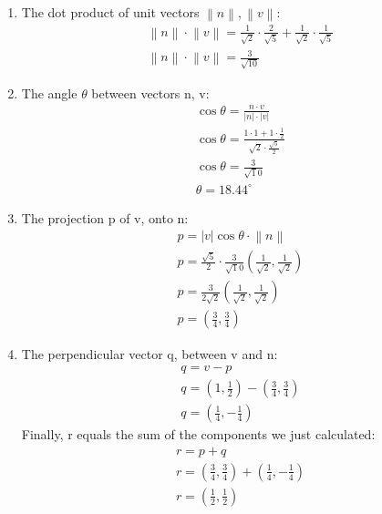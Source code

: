 \documentclass{article}
\begin{document}
\begin{enumerate}
\item
The dot product of unit vectors \(\left \| n \right \|, \left \| v \right \|\):
\begin{eqnarray*}
\left \| n \right \|\cdot \left \| v \right \|=\frac{1}{\sqrt{2}}\cdot\frac{2}{\sqrt{5}}+\frac{1}{\sqrt{2}}\cdot\frac{1}{\sqrt{5}}
\\\left \| n \right \|\cdot \left \| v \right \|=\frac{3}{\sqrt{10}}
\end{eqnarray*}

\item
The angle \(\theta\) between vectors n, v:
\begin{eqnarray*}
\cos \theta=\frac{n \cdot v}{\left | n \right | \cdot \left | v \right |}
\\\cos \theta=\frac{1\cdot1+1\cdot\frac{1}{2}}{\sqrt{2}\cdot\frac{\sqrt{5}}{2}}
\\\cos \theta=\frac{3}{\sqrt 10}
\\\theta=18.44^{\circ}
\end{eqnarray*}

\item
The projection p of v, onto n:
\begin{eqnarray*}
p=\left | v \right |\cos \theta\cdot\left \| n \right \|
\\p=\frac{\sqrt{5}}{2}\cdot\frac{3}{\sqrt 10}(\frac{1}{\sqrt{2}},\frac{1}{\sqrt{2}})
\\p=\frac{3}{2\sqrt 2}(\frac{1}{\sqrt{2}},\frac{1}{\sqrt{2}})
\\p=(\frac{3}{4},\frac{3}{4})
\end{eqnarray*}


\item
The perpendicular vector q, between v and n:
\begin{eqnarray*}
q=v-p
\\q=(1,\frac{1}{2})-(\frac{3}{4},\frac{3}{4})
\\q=(\frac{1}{4},-\frac{1}{4})
\end{eqnarray*}
Finally, r equals the sum of the components we just calculated:
\begin{eqnarray*}
r=p+q
\\r=(\frac{3}{4},\frac{3}{4})+(\frac{1}{4},-\frac{1}{4})
\\r=(\frac{1}{2},\frac{1}{2})
\end{eqnarray*}

\end{enumerate}
\end{document}

